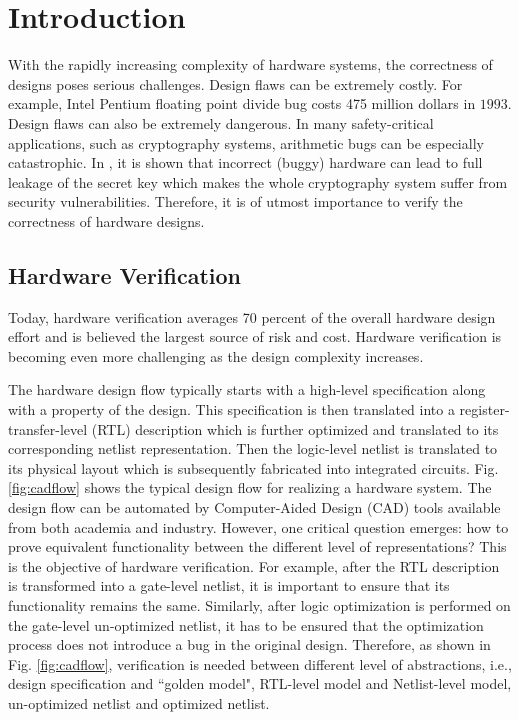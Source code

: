 \chapter{Introduction} \label{ch:intro}


With the rapidly increasing complexity of hardware systems, the correctness of  designs poses serious challenges.
Design flaws can be extremely costly. For example, Intel Pentium floating point divide bug costs 475 million dollars in $1993$.
Design flaws can also be extremely dangerous. In many safety-critical applications, such as
cryptography systems, arithmetic bugs can be especially catastrophic. In \cite{crypto:bug_attacks}, it is shown that 
incorrect (buggy) hardware can lead to full leakage of the secret key which makes the whole cryptography system suffer from security vulnerabilities.
Therefore, it is of utmost importance to verify the correctness of hardware designs.


\section{Hardware Verification}
Today, hardware verification averages 70 percent of the overall hardware design effort and is believed the largest source of risk and cost.
Hardware verification is becoming even more challenging as the design complexity increases.

The hardware design flow typically starts with a high-level specification along with a property of the design.
This specification is then translated into a register-transfer-level (RTL) description which is further 
optimized and translated to its corresponding netlist representation. 
Then the logic-level netlist is translated to its physical
layout which is subsequently fabricated into integrated circuits. 
Fig.\ref{fig:cadflow} shows the typical design flow for realizing a hardware system.
The design flow can be automated by Computer-Aided Design (CAD) tools available from 
both academia and industry.
However, one critical question emerges: how to prove equivalent functionality between the different level of representations? 
This is the objective of hardware verification. 
For example, after the RTL description is transformed into a
gate-level netlist, it is important to ensure that its functionality
remains the same. Similarly, after logic optimization is performed on
the gate-level un-optimized netlist, it has to be ensured that the optimization process
does not introduce a bug in the original design. 
Therefore, as shown in Fig. \ref{fig:cadflow}, verification is needed between different level of abstractions, i.e., 
design specification and ``golden model", RTL-level model and Netlist-level model, un-optimized netlist and optimized netlist. 

